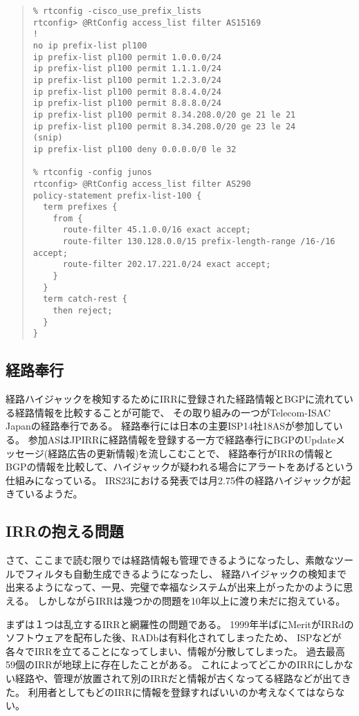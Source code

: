 \begin{quote}
\begin{minilinespace}
\begin{verbatim}
% rtconfig -cisco_use_prefix_lists
rtconfig> @RtConfig access_list filter AS15169
!
no ip prefix-list pl100
ip prefix-list pl100 permit 1.0.0.0/24
ip prefix-list pl100 permit 1.1.1.0/24
ip prefix-list pl100 permit 1.2.3.0/24
ip prefix-list pl100 permit 8.8.4.0/24
ip prefix-list pl100 permit 8.8.8.0/24
ip prefix-list pl100 permit 8.34.208.0/20 ge 21 le 21
ip prefix-list pl100 permit 8.34.208.0/20 ge 23 le 24
(snip)
ip prefix-list pl100 deny 0.0.0.0/0 le 32

% rtconfig -config junos
rtconfig> @RtConfig access_list filter AS290
policy-statement prefix-list-100 {
  term prefixes {
    from {
      route-filter 45.1.0.0/16 exact accept;
      route-filter 130.128.0.0/15 prefix-length-range /16-/16 accept;
      route-filter 202.17.221.0/24 exact accept;
    }
  }
  term catch-rest {
    then reject;
  }
}
\end{verbatim}
\end{minilinespace}
\end{quote}

\subsection{経路奉行}

経路ハイジャックを検知するためにIRRに登録された経路情報とBGPに流れている経路情報を比較することが可能で、
その取り組みの一つがTelecom-ISAC Japanの経路奉行である。
経路奉行には日本の主要ISP14社18ASが参加している。
参加ASはJPIRRに経路情報を登録する一方で経路奉行にBGPのUpdateメッセージ(経路広告の更新情報)を流しこむことで、
経路奉行がIRRの情報とBGPの情報を比較して、ハイジャックが疑われる場合にアラートをあげるという仕組みになっている。
IRS23における発表では月2.75件の経路ハイジャックが起きているようだ。

\subsection{IRRの抱える問題}

さて、ここまで読む限りでは経路情報も管理できるようになったし、素敵なツールでフィルタも自動生成できるようになったし、
経路ハイジャックの検知まで出来るようになって、一見、完璧で幸福なシステムが出来上がったかのように思える。
しかしながらIRRは幾つかの問題を10年以上に渡り未だに抱えている。

まずは１つは乱立するIRRと網羅性の問題である。
1999年半ばにMeritがIRRdのソフトウェアを配布した後、RADbは有料化されてしまったため、
ISPなどが各々でIRRを立てることになってしまい、情報が分散してしまった。
過去最高59個のIRRが地球上に存在したことがある。
これによってどこかのIRRにしかない経路や、管理が放置されて別のIRRだと情報が古くなってる経路などが出てきた。
利用者としてもどのIRRに情報を登録すればいいのか考えなくてはならない。

